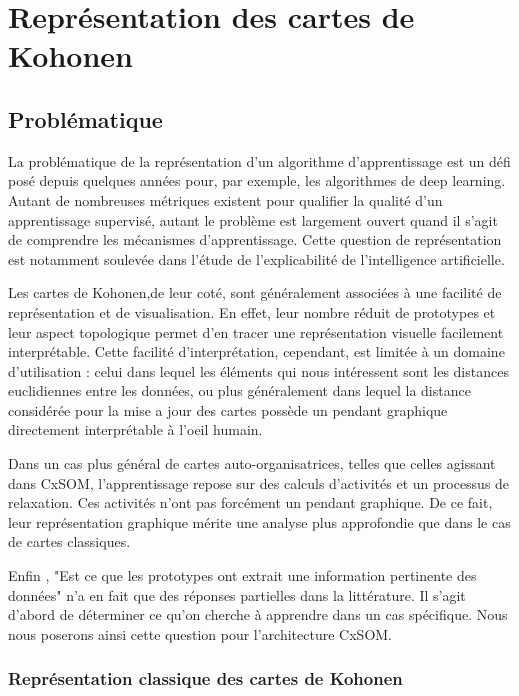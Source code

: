 \chapter{Représentation des cartes de Kohonen}
\graphicspath{{03-Representation/}}

\minitoc
\section{Problématique}

La problématique de la représentation d'un algorithme d'apprentissage est un défi posé depuis quelques années pour, par exemple, les algorithmes de deep learning. Autant de nombreuses métriques existent pour qualifier la qualité d'un apprentissage supervisé, autant le problème est largement ouvert quand il s'agit de comprendre les mécanismes d'apprentissage. Cette question de représentation est notamment soulevée dans l'étude de l'explicabilité de l'intelligence artificielle. 

Les cartes de Kohonen,de leur coté, sont généralement associées à une facilité de représentation et de visualisation. En effet, leur nombre réduit de prototypes et leur aspect topologique permet d'en tracer une représentation visuelle facilement interprétable. Cette facilité d'interprétation, cependant, est limitée à un domaine d'utilisation : celui dans lequel les éléments qui nous intéressent sont les distances euclidiennes entre les données, ou plus généralement dans lequel la distance considérée pour la mise a jour des cartes possède un pendant graphique directement interprétable à l'oeil humain.

Dans un cas plus général de cartes auto-organisatrices, telles que celles agissant dans CxSOM, l'apprentissage repose sur des calculs d'activités et un processus de relaxation. Ces activités n'ont pas forcément un pendant graphique. De ce fait, leur représentation graphique mérite une analyse plus approfondie que dans le cas de cartes classiques. 

Enfin , "Est ce que les prototypes ont extrait une information pertinente des données" n'a en fait que des réponses partielles dans la littérature. Il s'agit d'abord de déterminer ce qu'on cherche à apprendre dans un cas spécifique. Nous nous poserons ainsi cette question pour l'architecture CxSOM. 

\subsection{Représentation classique des cartes de Kohonen}

